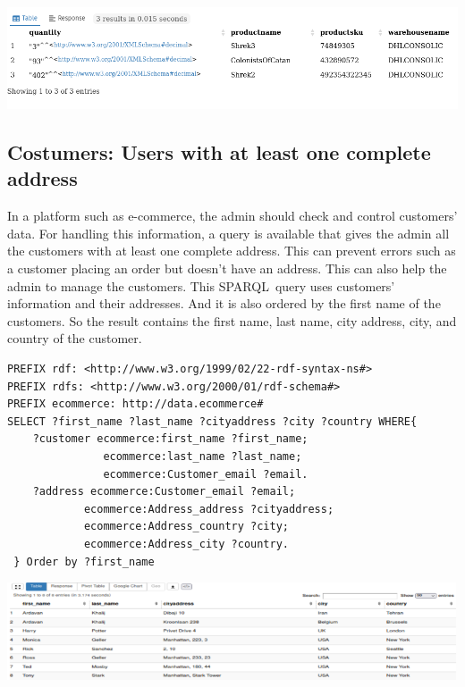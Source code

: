 \documentclass{article}
\begin{document}
\begin{center}
   \includegraphics[scale=0.5]{OISreport-warehouse-query.png}
\end{center}



\subsection{Costumers: Users with at least one complete address}
In a platform such as e-commerce, the admin should check and control customers' data. For handling this information, a query is available that gives the admin all the customers with at least one complete address. This can prevent errors such as a customer placing an order but doesn't have an address. This can also help the admin to manage the customers. This SPARQL query uses customers' information and their addresses. And it is also ordered by the first name of the customers. So the result contains the first name, last name, city address, city, and country of the customer.

\begin{lstlisting}[breaklines, frame=single]
PREFIX rdf: <http://www.w3.org/1999/02/22-rdf-syntax-ns#>
PREFIX rdfs: <http://www.w3.org/2000/01/rdf-schema#>
PREFIX ecommerce: http://data.ecommerce#
SELECT ?first_name ?last_name ?cityaddress ?city ?country WHERE{
	?customer ecommerce:first_name ?first_name;
			   ecommerce:last_name ?last_name;
			   ecommerce:Customer_email ?email.
	?address ecommerce:Customer_email ?email;
			ecommerce:Address_address ?cityaddress;
			ecommerce:Address_country ?city;
			ecommerce:Address_city ?country.
 } Order by ?first_name
\end{lstlisting}

\begin{center}
   \includegraphics[scale=0.6]{OISreport-costumer-query.png}
\end{center}
\end{document}

